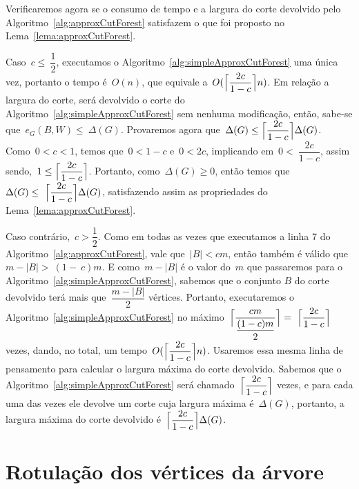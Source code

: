\documentclass[a4paper,12pt]{article}
\DeclarePairedDelimiter\ceil{\lceil}{\rceil}
\begin{document}
	Verificaremos agora se o consumo de tempo e a largura do corte
	devolvido pelo Algoritmo~\ref{alg:approxCutForest} satisfazem
	o que foi proposto no Lema~\ref{lema:approxCutForest}.
	
	Caso~$c\le~\dfrac{1}{2}$, executamos o
	Algoritmo~\ref{alg:simpleApproxCutForest} uma única vez, 
	portanto o tempo é~$O(n)$, que equivale 
	a~$O(\ceil[\Big]{\dfrac{2c}{1-c}} n)$.
	Em relação a largura do corte, será devolvido o corte do 
	Algoritmo~\ref{alg:simpleApproxCutForest} sem nenhuma 
	modificação, então, sabe-se que~$e_G(B,W)\le~\Delta(G)$.
	Provaremos agora 
	que~$\Delta(G) \le \ceil[\Big]{ \dfrac{2c}{1-c}}\Delta(G)$.
	Como~$0<c<1$, temos que~$0<1-c$ e~$0<2c$, implicando  
	em~$0<~\dfrac{2c}{1-c}$, assim 
	sendo,~$1\le \ceil[\Big]{ \dfrac{2c}{1-c}}$.
	Portanto, como~$\Delta(G)\ge 0$, então temos 
	que~$\Delta(G)\le~\ceil[\Big]{\dfrac{2c}{1-c}}\Delta(G)$, 
	satisfazendo assim as propriedades do 
	Lema~\ref{lema:approxCutForest}.

	Caso contrário,~$c>\dfrac{1}{2}$. Como em todas as vezes que
	executamos a linha 7 do Algoritmo~\ref{alg:approxCutForest}, 
	vale que~$|B|<cm$, então também é válido que~$m-|B|>~(1-~c)m$.
	E como~$m-|B|$ é o valor do~$m$ que passaremos para o 
	Algoritmo~\ref{alg:simpleApproxCutForest}, sabemos que o 
	conjunto $B$ do corte devolvido terá mais 
	que~$\dfrac{m-|B|}{2}$ vértices.
	Portanto, executaremos o 
	Algoritmo~\ref{alg:simpleApproxCutForest} no 
	máximo~$\ceil[\Big]{\dfrac{cm}{\dfrac{(1-c)m}{2}}} 
	=~\ceil[\Big]{\dfrac{2c}{1-c}}$ vezes, dando, no total, um
	tempo~$O(\ceil[\Big]{ \dfrac{2c}{1-c}} n)$.
	Usaremos essa mesma linha de pensamento para calcular o largura
	máxima do corte devolvido. Sabemos que o 
	Algoritmo~\ref{alg:simpleApproxCutForest} será 
	chamado~$\ceil[\Big]{\dfrac{2c}{1-c}}$ vezes, e para cada uma 
	das vezes ele devolve um corte cuja largura 
	máxima é~$\Delta(G)$, portanto, a largura máxima do corte 
	devolvido é~$\ceil[\Big]{\dfrac{2c}{1-c}}\Delta(G)$.







\newpage

\section {Rotulação dos vértices da árvore}
\end{document}
